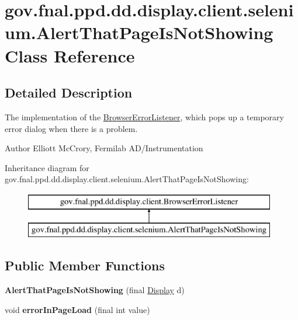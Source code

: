 \hypertarget{classgov_1_1fnal_1_1ppd_1_1dd_1_1display_1_1client_1_1selenium_1_1AlertThatPageIsNotShowing}{\section{gov.\-fnal.\-ppd.\-dd.\-display.\-client.\-selenium.\-Alert\-That\-Page\-Is\-Not\-Showing Class Reference}
\label{classgov_1_1fnal_1_1ppd_1_1dd_1_1display_1_1client_1_1selenium_1_1AlertThatPageIsNotShowing}
}


\subsection{Detailed Description}
The implementation of the \hyperlink{interfacegov_1_1fnal_1_1ppd_1_1dd_1_1display_1_1client_1_1BrowserErrorListener}{Browser\-Error\-Listener}, which pops up a temporary error dialog when there is a problem.

\begin{DoxyAuthor}{Author}
Elliott Mc\-Crory, Fermilab A\-D/\-Instrumentation 
\end{DoxyAuthor}
Inheritance diagram for gov.\-fnal.\-ppd.\-dd.\-display.\-client.\-selenium.\-Alert\-That\-Page\-Is\-Not\-Showing\-:\begin{figure}[H]
\begin{center}
\leavevmode
\includegraphics[height=2.000000cm]{classgov_1_1fnal_1_1ppd_1_1dd_1_1display_1_1client_1_1selenium_1_1AlertThatPageIsNotShowing}
\end{center}
\end{figure}
\subsection*{Public Member Functions}
\begin{DoxyCompactItemize}
\item 
\hypertarget{classgov_1_1fnal_1_1ppd_1_1dd_1_1display_1_1client_1_1selenium_1_1AlertThatPageIsNotShowing_a4f9d56ae893432d34ccce59a15af49c1}{{\bfseries Alert\-That\-Page\-Is\-Not\-Showing} (final \hyperlink{interfacegov_1_1fnal_1_1ppd_1_1dd_1_1signage_1_1Display}{Display} d)}\label{classgov_1_1fnal_1_1ppd_1_1dd_1_1display_1_1client_1_1selenium_1_1AlertThatPageIsNotShowing_a4f9d56ae893432d34ccce59a15af49c1}

\item 
\hypertarget{classgov_1_1fnal_1_1ppd_1_1dd_1_1display_1_1client_1_1selenium_1_1AlertThatPageIsNotShowing_a2830890a7364d6ce4a328cda1a784fa0}{void {\bfseries error\-In\-Page\-Load} (final int value)}\label{classgov_1_1fnal_1_1ppd_1_1dd_1_1display_1_1client_1_1selenium_1_1AlertThatPageIsNotShowing_a2830890a7364d6ce4a328cda1a784fa0}

\end{DoxyCompactItemize}


